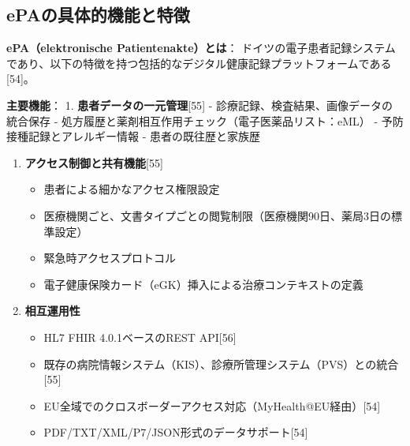 \documentclass[
  a4paper,
  a4paper,
  11pt]{ltjsbook}
\providecommand{\tightlist}{%
  \setlength{\itemsep}{0pt}\setlength{\parskip}{0pt}}
\begin{document}
\subsection{ePAの具体的機能と特徴}\label{epaux306eux5177ux4f53ux7684ux6a5fux80fdux3068ux7279ux5fb4}

\begin{tcolorbox}[enhanced jigsaw, toprule=.15mm, bottomtitle=1mm, coltitle=black, left=2mm, opacityback=0, arc=.35mm, colbacktitle=quarto-callout-note-color!10!white, colback=white, opacitybacktitle=0.6, bottomrule=.15mm, rightrule=.15mm, breakable, title=\textcolor{quarto-callout-note-color}{\faInfo}\hspace{0.5em}{Note}, toptitle=1mm, titlerule=0mm, colframe=quarto-callout-note-color-frame, leftrule=.75mm]

\textbf{ePA（elektronische Patientenakte）とは}：
ドイツの電子患者記録システムであり、以下の特徴を持つ包括的なデジタル健康記録プラットフォームである{[}54{]}。

\textbf{主要機能}： 1. \textbf{患者データの一元管理}{[}55{]} -
診療記録、検査結果、画像データの統合保存 -
処方履歴と薬剤相互作用チェック（電子医薬品リスト：eML） -
予防接種記録とアレルギー情報 - 患者の既往歴と家族歴

\begin{enumerate}
\def\labelenumi{\arabic{enumi}.}
\setcounter{enumi}{1}
\tightlist
\item
  \textbf{アクセス制御と共有機能}{[}55{]}

  \begin{itemize}
  \tightlist
  \item
    患者による細かなアクセス権限設定
  \item
    医療機関ごと、文書タイプごとの閲覧制限（医療機関90日、薬局3日の標準設定）
  \item
    緊急時アクセスプロトコル
  \item
    電子健康保険カード（eGK）挿入による治療コンテキストの定義
  \end{itemize}
\item
  \textbf{相互運用性}

  \begin{itemize}
  \tightlist
  \item
    HL7 FHIR 4.0.1ベースのREST API{[}56{]}
  \item
    既存の病院情報システム（KIS）、診療所管理システム（PVS）との統合{[}55{]}
  \item
    EU全域でのクロスボーダーアクセス対応（MyHealth@EU経由）{[}54{]}
  \item
    PDF/TXT/XML/P7/JSON形式のデータサポート{[}54{]}
  \end{itemize}
\end{enumerate}


\end{tcolorbox}
\end{document}
